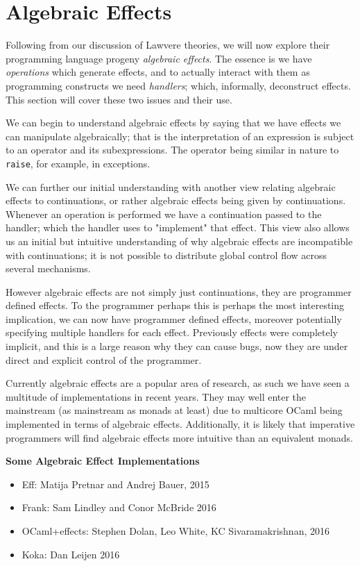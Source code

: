 \section{Algebraic Effects}
Following from our discussion of Lawvere theories,
we will now explore their programming language progeny \textit{algebraic effects}.
The essence is we have \textit{operations} which generate effects,
and to actually interact with them as programming constructs
we need \textit{handlers}\cite{plotkin2009handlers};
which, informally, deconstruct effects.
This section will cover these two issues and their use.

We can begin to understand algebraic effects by saying that
we have effects we can manipulate algebraically;
that is the interpretation of an expression is
subject to an operator and its subexpressions.
The operator being similar in nature to \texttt{raise},
for example, in exceptions.

We can further our initial understanding with another view
relating algebraic effects to continuations,
or rather algebraic effects being given by continuations.
Whenever an operation is performed we have a continuation
passed to the handler;
which the handler uses to "implement" that effect.
This view also allows us an initial but intuitive
understanding of why algebraic effects are incompatible with continuations;
it is not possible to distribute global control flow across several mechanisms.

However algebraic effects are not simply just continuations,
they are programmer defined effects.
To the programmer perhaps this is perhaps the most interesting implication,
we can now have programmer defined effects,
moreover potentially specifying multiple handlers for each effect.
Previously effects were completely implicit,
and this is a large reason why they can cause bugs,
now they are under direct and explicit control of the programmer.

Currently algebraic effects are a popular area of research,
as such we have seen a multitude of implementations in recent years.
They may well enter the mainstream (as mainstream as monads at least)
due to multicore OCaml being implemented in terms of algebraic effects.
Additionally, it is likely that imperative programmers
will find algebraic effects more intuitive than an equivalent monads.

\textbf{Some Algebraic Effect Implementations}
\begin{itemize}
    \item Eff: Matija Pretnar and Andrej Bauer,
        2015\cite{bauer2015programming}
    \item Frank: Sam Lindley and Conor McBride
        2016\cite{Lindley:2016vz}
    \item OCaml+effects: Stephen Dolan, Leo White, KC Sivaramakrishnan,
        2016\cite{ocamlplseff}
    \item Koka: Dan Leijen
        2016\cite{leijen:16}
\end{itemize}

